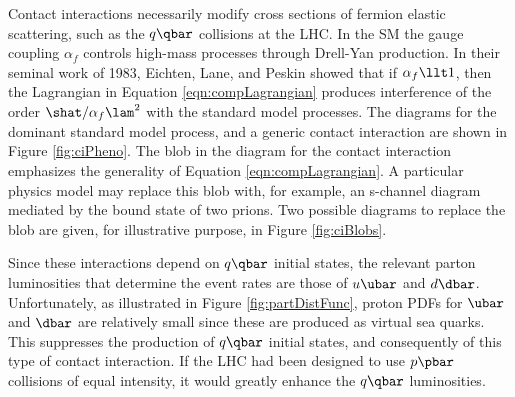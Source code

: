 Contact interactions necessarily modify cross sections of fermion elastic scattering, such as the $q\qbar$ collisions at the LHC.
In the SM the gauge coupling $\alpha_f$ controls high-mass processes through Drell-Yan production.
In their seminal work of 1983, Eichten, Lane, and Peskin showed that if $\alpha_f\llt1$, then the Lagrangian in Equation \ref{eqn:compLagrangian} produces interference of the order $\shat/\alpha_f\lam^2$ with the standard model processes. \cite{eichten}
The diagrams for the dominant standard model process, and a generic contact interaction are shown in Figure \ref{fig:ciPheno}.
The blob in the diagram for the contact interaction emphasizes the generality of Equation \ref{eqn:compLagrangian}. A particular physics model may replace this blob with, for example, an s-channel diagram mediated by the bound state of two prions.
Two possible diagrams to replace the blob are given, for illustrative purpose, in Figure \ref{fig:ciBlobs}.

Since these interactions depend on $q\qbar$ initial states, the relevant parton luminosities that determine the event rates are those of $u\ubar$ and $d\dbar$.
Unfortunately, as illustrated in Figure \ref{fig:partDistFunc}, proton PDFs for $\ubar$ and $\dbar$ are relatively small since these are produced as virtual sea quarks.
This suppresses the production of $q\qbar$ initial states, and consequently of this type of contact interaction.
If the LHC had been designed to use $p\pbar$ collisions of equal intensity, it would greatly enhance the $q\qbar$ luminosities.

